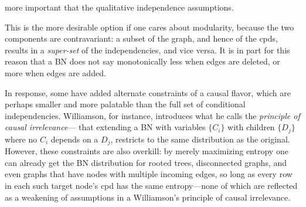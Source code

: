 \documentclass{article}
\theoremstyle{plain}
\theoremstyle{definition}
\theoremstyle{remark}
\newcommand{\commentout}[1]{\ignorespaces}
\numberwithin{equation}{section}
\begin{document}
{        more important that the qualitative independence assumptions.  
\begin{vfull}
	This is the more desirable option if one cares about
	modularity, because the two components are contravariant: a subset of
	the graph, and hence of the cpds, results in a \emph{super-set} of
	the independencies, and vice versa. It is in part for this reason
	that a BN does not say monotonically less when edges are deleted, or
	more when edges are added. 
\end{vfull}

\commentout{
To do without the independence assumptions, one might hope
        that maximizing entropy would recover the conditional
        independencies, as maximizing entropy tends to make things as
        independent as possible given the constraints --- but
        maximizing entropy alone is not enough
        (\Cref{ex:counterexample}).
}
\begin{vfull}	
	In response, some \cite{williamson2001foundations}\cite{holmes2001independence} have added alternate constraints of a causal flavor, which are perhaps smaller and more palatable than the full set of conditional independencies.  Williamson, for instance, introduces what he calls the \emph{principle of causal irrelevance}--- that extending a BN with variables $\{C_i\}$ with children $\{D_j\}$ where no $C_i$ depends on a $D_j$, restricts to the same distribution as the original.  However, these constraints are also overkill: by merely maximizing entropy one can already get the BN distribution for rooted trees, disconnected graphs, and even graphs that have nodes with multiple incoming edges, so long as every row in each such target node's cpd has the same entropy---none of which are reflected as a weakening of assumptions in a Williamson's principle of causal irrelevance.
	

\end{vfull}}
\end{document}
